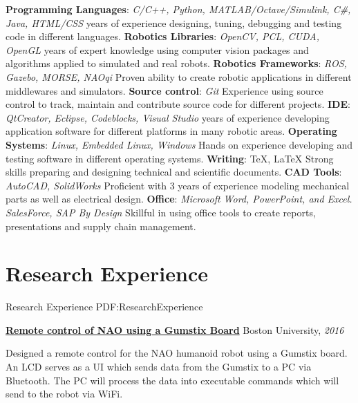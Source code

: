 \documentclass[letterpaper,MMMyyyy,nonstop]{simpleresumecv}
\begin{document}
\begin{body}
\GapNoBreak
\BulletItem
\textbf{Programming Languages}: \textit{C/C++, Python, MATLAB/Octave/Simulink, C\#, Java, HTML/CSS}
 years of experience designing, tuning, debugging and testing code in different languages.
\BulletItem
\textbf{Robotics Libraries}: \textit{OpenCV, PCL, CUDA, OpenGL}
 years of expert knowledge using computer vision packages and algorithms applied to simulated and real robots.
\BulletItem
\textbf{Robotics Frameworks}: \textit{ROS, Gazebo, MORSE, NAOqi}
\SubBulletItem
Proven ability to create robotic applications in different middlewares and simulators.
\BulletItem
\textbf{Source control}: \textit{Git}
\SubBulletItem
Experience using source control to track, maintain and contribute source code for different projects.
\BulletItem
\textbf{IDE}: \textit{QtCreator, Eclipse, Codeblocks, Visual Studio}
 years of experience developing application software for different platforms in many robotic areas.
\BulletItem
\textbf{Operating Systems}: \textit{Linux, Embedded Linux, Windows}
\SubBulletItem
Hands on experience developing and testing software in different operating systems.
\BulletItem
\textbf{Writing}: {\TeX}, {\LaTeX}
\SubBulletItem
Strong skills preparing and designing technical and scientific documents.
\BulletItem
\textbf{CAD Tools}: \textit{AutoCAD, SolidWorks}
\SubBulletItem
Proficient with 3 years of experience modeling mechanical parts as well as electrical design.
\BulletItem
\textbf{Office}: \textit{Microsoft Word, PowerPoint, and Excel. SalesForce, SAP By Design}
\SubBulletItem
Skillful in using office tools to create reports, presentations and supply chain management.


\section
{Research Experience}
{Research Experience}
{PDF:ResearchExperience}

\href{https://github.com/davidlavy88/NAOGumstix/blob/master/ec535FinalReport.pdf}
{\textbf{Remote control of NAO using a Gumstix Board}}
\hfill
Boston University, \textit{2016}

\GapNoBreak
\BulletItem
Designed a remote control for the NAO humanoid robot using a Gumstix board. An LCD serves as a UI which sends data from the Gumstix to a PC via Bluetooth. The PC will process the data into executable commands which will send to the robot via WiFi.
\GapNoBreak


\end{body}
\end{document}
